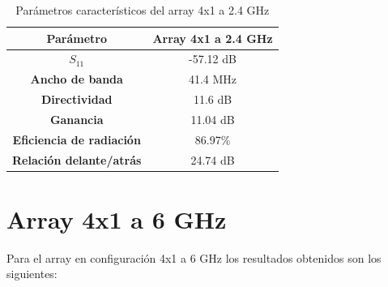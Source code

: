 \begin{table}[H]
  
   
   \small %
   \centering %
   \begin{tabular}{c c} %
   \toprule[\heavyrulewidth]\toprule[\heavyrulewidth]
   \textbf{Parámetro} & \textbf{Array 4x1 a 2.4 GHz} \\ 
   \midrule
   \textbf{$S_{11}$} & -57.12 dB \\
   \textbf{Ancho de banda} & 41.4 MHz \\
   \textbf{Directividad} & 11.6 dB \\
   \textbf{Ganancia} & 11.04 dB \\
   \textbf{Eficiencia de radiación} & 86.97\% \\
   \textbf{Relación delante/atrás} & 24.74 dB \\

   \bottomrule[\heavyrulewidth] 
   \end{tabular}
   
   \caption{Parámetros característicos del array 4x1 a 2.4 GHz} 
   \label{tab:res4x11}
\end{table}




















\newpage
\section{Array 4x1 a 6 GHz}
\par Para el array en configuración 4x1 a 6 GHz los resultados obtenidos son los siguientes:


